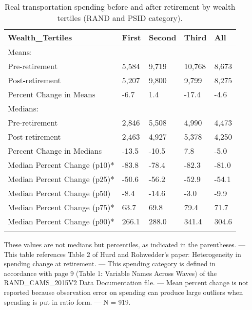 \begin{table}[tbp] \centering
{}

\caption{Real transportation spending before and after retirement by wealth tertiles (RAND and PSID category).}
\begin{tabularx}{\textwidth}{lCCCC}

\toprule
{Wealth\_Tertiles}&{First}&{Second}&{Third}&{All} \tabularnewline
\midrule\addlinespace[1.5ex]
Means:&&&& \tabularnewline
\midrule Pre-retirement&5,584&9,719&10,768&8,673 \tabularnewline
Post-retirement&5,207&9,800&9,799&8,275 \tabularnewline
Percent Change in Means&-6.7&1.4&-17.4&-4.6 \tabularnewline
\midrule Medians:&&&& \tabularnewline
\midrule Pre-retirement&2,846&5,508&4,990&4,473 \tabularnewline
Post-retirement&2,463&4,927&5,378&4,250 \tabularnewline
Percent Change in Medians&-13.5&-10.5&7.8&-5.0 \tabularnewline
Median Percent Change (p10)*&-83.8&-78.4&-82.3&-81.0 \tabularnewline
Median Percent Change (p25)*&-50.6&-56.2&-52.9&-54.1 \tabularnewline
Median Percent Change (p50)&-8.4&-14.6&-3.0&-9.9 \tabularnewline
Median Percent Change (p75)*&63.7&69.8&79.4&71.7 \tabularnewline
Median Percent Change (p90)*&266.1&288.0&341.4&304.6 \tabularnewline
\bottomrule \addlinespace[1.5ex]

\end{tabularx}
\begin{flushleft}
\footnotesize *These values are not medians but percentiles, as indicated in the parentheses. \linebreak --- \linebreak This table references Table 2 of Hurd and Rohwedder's paper: Heterogeneity in spending change at retirement. \linebreak --- \linebreak This spending category is defined in accordance with page 9 (Table 1: Variable Names Across Waves) of the RAND\_CAMS\_2015V2 Data Documentation file. \linebreak --- \linebreak Mean percent change is not reported because observation error on spending can produce large outliers when spending is put in ratio form. \linebreak --- \linebreak N = 919.
\end{flushleft}
\end{table}
